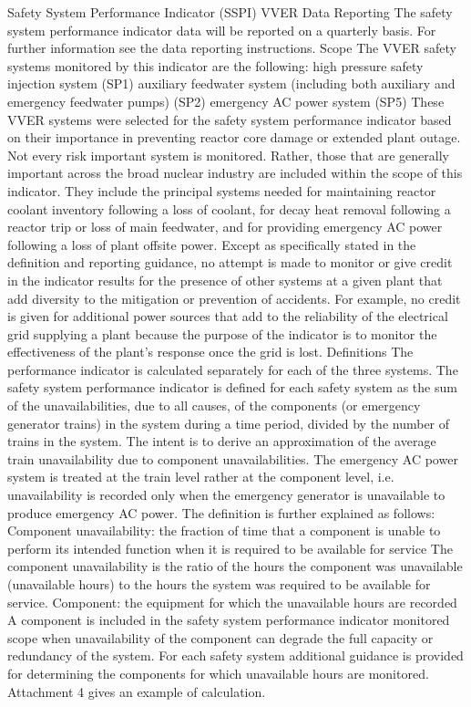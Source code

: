 Safety System Performance Indicator (SSPI) VVER
Data Reporting
The safety system performance indicator data will be reported on a quarterly basis. For further information see the data reporting instructions.
Scope
The VVER safety systems monitored by this indicator are the following:
high pressure safety injection system (SP1)
auxiliary feedwater system (including both auxiliary and emergency feedwater pumps) (SP2)
emergency AC power system (SP5)
These VVER systems were selected for the safety system performance indicator based on their importance in preventing reactor core damage or extended plant outage. Not every risk important system is monitored. Rather, those that are generally important across the broad nuclear industry are included within the scope of this indicator. They include the principal systems needed for maintaining reactor coolant inventory following a loss of coolant, for decay heat removal following a reactor trip or loss of main feedwater, and for providing emergency AC power following a loss of plant offsite power.
Except as specifically stated in the definition and reporting guidance, no attempt is made to monitor or give credit in the indicator results for the presence of other systems at a given plant that add diversity to the mitigation or prevention of accidents. For example, no credit is given for additional power sources that add to the reliability of the electrical grid supplying a plant because the purpose of the indicator is to monitor the effectiveness of the plant's response once the grid is lost.
Definitions
The performance indicator is calculated separately for each of the three systems. The safety system performance indicator is defined for each safety system as the sum of the unavailabilities, due to all causes, of the components (or emergency generator trains) in the system during a time period, divided by the number of trains in the system. The intent is to derive an approximation of the average train unavailability due to component unavailabilities. The emergency AC power system is treated at the train level rather at the component level, i.e. unavailability is recorded only when the emergency generator is unavailable to produce emergency AC power. The definition is further explained as follows:
Component unavailability: the fraction of time that a component is unable to perform its intended function when it is required to be available for service
The component unavailability is the ratio of the hours the component was unavailable (unavailable hours) to the hours the system was required to be available for service.
Component: the equipment for which the unavailable hours are recorded
A component is included in the safety system performance indicator monitored scope when unavailability of the component can degrade the full capacity or redundancy of the system. For each safety system additional guidance is provided for determining the components for which unavailable hours are monitored. Attachment 4 gives an example of calculation.

